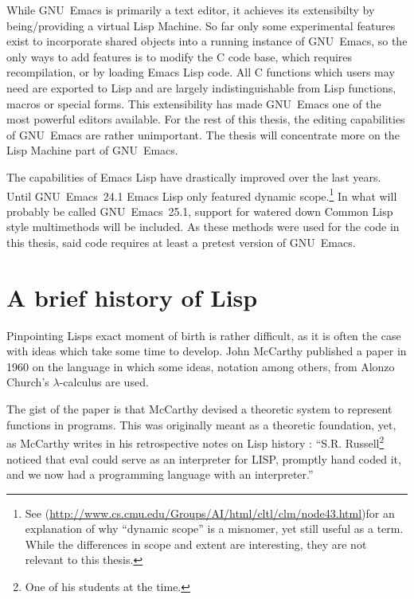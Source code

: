 \documentclass[a4paper,10pt,twoside]{report}
\newcommand{\el}{Emacs Lisp}
\newcommand{\cl}{Common Lisp}
\newcommand{\emacs}{GNU~Emacs}
\newcommand{\emacsv}[1]{GNU~Emacs~#1}
\begin{document}
While \emacs{} is primarily a text editor, it achieves its extensibilty by
being/providing a virtual Lisp Machine.  So far only some experimental features
exist to incorporate shared objects into a running instance of \emacs{}, so the
only ways to add features is to modify the C code base, which requires
recompilation, or by loading \el{} code.  All C functions which users may need
are exported to Lisp and are largely indistinguishable from Lisp functions,
macros or special forms.  This extensibility has made \emacs{} one of the most
powerful editors available.  For the rest of this thesis, the editing
capabilities of \emacs{} are rather unimportant.  The thesis will concentrate
more on the Lisp Machine part of \emacs{}.

The capabilities of \el{} have drastically improved over the last years.  Until
\emacsv{24.1} \el{} only featured dynamic scope\cite[See “* Lisp changes in
Emacs 24.1”]{Emacs-Lexical}.\footnote{See \cite{CLTL2}
  (\url{http://www.cs.cmu.edu/Groups/AI/html/cltl/clm/node43.html})for an
  explanation of why ``dynamic scope'' is a misnomer, yet still useful as a
  term.  While the differences in scope and extent are interesting, they are not
  relevant to this thesis.}  In what will probably be called \emacsv{25.1},
support for watered down \cl{} style multimethods will be included.  As these
methods were used for the code in this thesis, said code requires at least a
pretest version of \emacs{}\cite{emacs-pretest}.

\section{A brief history of Lisp}
\label{sec:lisp-hist}

Pinpointing Lisps exact moment of birth is rather difficult, as it is often the
case with ideas which take some time to develop.  John McCarthy published a
paper in 1960 on the language\cite{rec-fun-sym-expr} in which some ideas,
notation among others, from Alonzo Church’s $\lambda$-calculus are used.

The gist of the paper is that McCarthy devised a theoretic system to represent
functions in programs.  This was originally meant as a theoretic foundation,
yet, as McCarthy writes in his retrospective notes on Lisp history
\cite{lisp-hist}: “S.R. Russell\footnote{One of his students at the time.}
noticed that eval could serve as an interpreter for LISP, promptly hand coded
it, and we now had a programming language with an interpreter.”
\end{document}
